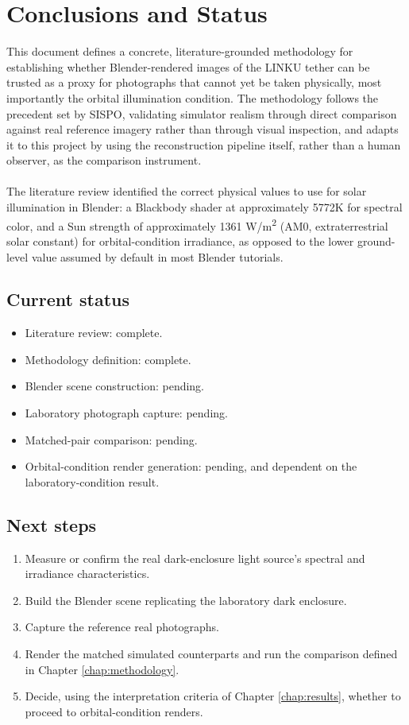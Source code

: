 \chapter{Conclusions and Status}

This document defines a concrete, literature-grounded methodology for establishing whether Blender-rendered images of the LINKU tether can be trusted as a proxy for photographs that cannot yet be taken physically, most importantly the orbital illumination condition. The methodology follows the precedent set by SISPO, validating simulator realism through direct comparison against real reference imagery rather than through visual inspection, and adapts it to this project by using the reconstruction pipeline itself, rather than a human observer, as the comparison instrument.
\\\\
The literature review identified the correct physical values to use for solar illumination in Blender: a Blackbody shader at approximately 5772K for spectral color, and a Sun strength of approximately 1361 W/m\textsuperscript{2} (AM0, extraterrestrial solar constant) for orbital-condition irradiance, as opposed to the lower ground-level value assumed by default in most Blender tutorials.

\section{Current status}

\begin{itemize}
    \item Literature review: complete.
    \item Methodology definition: complete.
    \item Blender scene construction: pending.
    \item Laboratory photograph capture: pending.
    \item Matched-pair comparison: pending.
    \item Orbital-condition render generation: pending, and dependent on the laboratory-condition result.
\end{itemize}

\section{Next steps}

\begin{enumerate}
    \item Measure or confirm the real dark-enclosure light source's spectral and irradiance characteristics.
    \item Build the Blender scene replicating the laboratory dark enclosure.
    \item Capture the reference real photographs.
    \item Render the matched simulated counterparts and run the comparison defined in Chapter \ref{chap:methodology}.
    \item Decide, using the interpretation criteria of Chapter \ref{chap:results}, whether to proceed to orbital-condition renders.
\end{enumerate}
